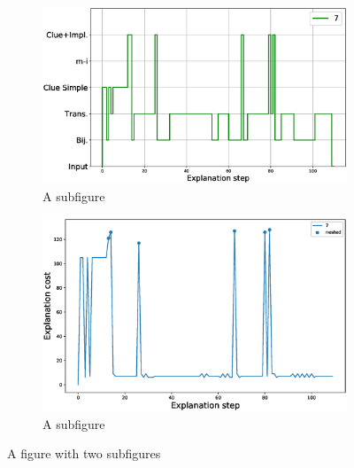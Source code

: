 \begin{figure}
\centering
\begin{subfigure}{.5\textwidth}
\centering
\includegraphics[width=\linewidth]{figures/plot_cost_steps_7.eps}
\caption{A subfigure}
\label{fig:sub1}
\end{subfigure}%
\begin{subfigure}{.5\textwidth}
\centering
\includegraphics[width=0.9\linewidth]{figures/7.eps}
\caption{A subfigure}
\label{fig:sub2}
\end{subfigure}
\caption{A figure with two subfigures}
\label{fig:test}
\end{figure}

